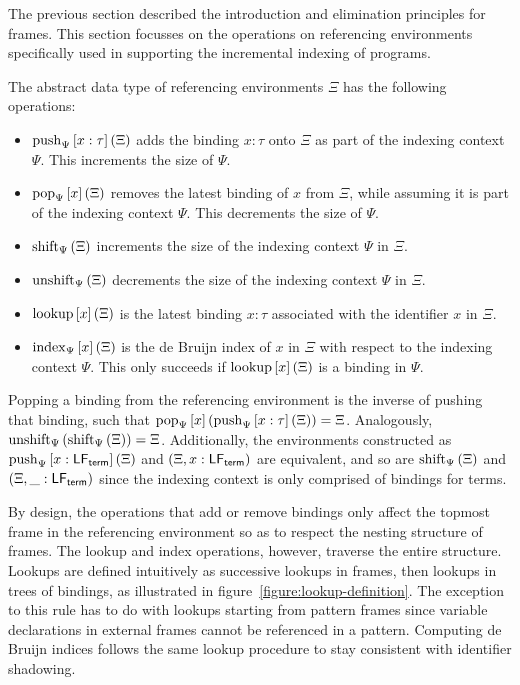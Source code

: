 The previous section described the introduction and elimination principles for frames.
This section focusses on the operations on referencing environments specifically used in supporting the incremental indexing of \Beluga programs.

The abstract data type of referencing environments $\Xi$ has the following operations:
\begin{itemize}
\item
$\operatorname{push}_{\Psi}\left[x : \tau\right]\left(\Xi\right)$ adds the binding $x : \tau$ onto $\Xi$ as part of the indexing context $\Psi$.
This increments the size of $\Psi$.
\item
$\operatorname{pop}_{\Psi}\left[x\right]\left(\Xi\right)$ removes the latest binding of $x$ from $\Xi$, while assuming it is part of the indexing context $\Psi$.
This decrements the size of $\Psi$.
\item
$\operatorname{shift}_{\Psi}\left(\Xi\right)$ increments the size of the indexing context $\Psi$ in $\Xi$.
\item
$\operatorname{unshift}_{\Psi}\left(\Xi\right)$ decrements the size of the indexing context $\Psi$ in $\Xi$.
\item
$\operatorname{lookup}\left[x\right]\left(\Xi\right)$ is the latest binding $x : \tau$ associated with the identifier $x$ in $\Xi$.
\item
$\operatorname{index}_{\Psi}\left[x\right]\left(\Xi\right)$ is the de Bruijn index of $x$ in $\Xi$ with respect to the indexing context $\Psi$.
This only succeeds if $\operatorname{lookup}\left[x\right]\left(\Xi\right)$ is a binding in $\Psi$.
\end{itemize}
Popping a binding from the referencing environment is the inverse of pushing that binding, such that $\operatorname{pop}_{\Psi}\left[x\right]\left(\operatorname{push}_{\Psi}\left[x : \tau\right]\left(\Xi\right)\right) = \Xi$.
Analogously, $\operatorname{unshift}_{\Psi}\left(\operatorname{shift}_{\Psi}\left(\Xi\right)\right) = \Xi$.
Additionally, the environments constructed as $\operatorname{push}_{\Psi}\left[x : \mathsf{LF}_{\mathsf{term}}\right]\left(\Xi\right) $ and $ (\Xi, x : \mathsf{LF}_{\mathsf{term}})$ are equivalent, and so are $\operatorname{shift}_{\Psi}\left(\Xi\right) $ and $ (\Xi, \_ : \mathsf{LF}_{\mathsf{term}})$ since the \LF indexing context is only comprised of bindings for \LF terms.

By design, the operations that add or remove bindings only affect the topmost frame in the referencing environment so as to respect the nesting structure of frames.
The lookup and index operations, however, traverse the entire structure.
Lookups are defined intuitively as successive lookups in frames, then lookups in trees of bindings, as illustrated in figure~\ref{figure:lookup-definition}.
The exception to this rule has to do with lookups starting from pattern frames since variable declarations in external frames cannot be referenced in a pattern.
Computing de Bruijn indices follows the same lookup procedure to stay consistent with identifier shadowing.

